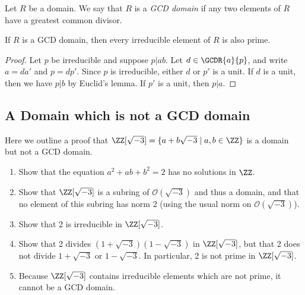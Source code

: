 \documentclass{article}
\begin{document}
\begin{dfn}
Let $R$ be a domain. We say that $R$ is a \emph{GCD domain} if any two elements of $R$ have a greatest common divisor.
\end{dfn}

\begin{prop}
If $R$ is a GCD domain, then every irreducible element of $R$ is also prime.
\end{prop}

\begin{proof}
Let $p$ be irreducible and suppose $p|ab$. Let $d \in \GCDR{a}{p}$, and write $a = da'$ and $p = dp'$. Since $p$ is irreducible, either $d$ or $p'$ is a unit. If $d$ is a unit, then we have $p|b$ by Euclid's lemma. If $p'$ is a unit, then $p|a$.
\end{proof}

\subsection*{A Domain which is not a GCD domain}

Here we outline a proof that $\ZZ[\sqrt{-3}] = \{ a+b\sqrt{-3} \mid a,b \in \ZZ \}$ is a domain but not a GCD domain.

\begin{enumerate}
\item Show that the equation $a^2 + ab + b^2 = 2$ has no solutions in $\ZZ$.
\item Show that $\ZZ[\sqrt{-3}]$ is a subring of $\mathcal{O}(\sqrt{-3})$ and thus a domain, and that no element of this subring has norm 2 (using the usual norm on $\mathcal{O}(\sqrt{-3})$).
\item Show that 2 is irreducible in $\ZZ[\sqrt{-3}]$.
\item Show that 2 divides $(1 + \sqrt{-3})(1 - \sqrt{-3})$ in $\ZZ[\sqrt{-3}]$, but that 2 does not divide $1 + \sqrt{-3}$ or $1 - \sqrt{-3}$. In particular, 2 is not prime in $\ZZ[\sqrt{-3}]$.
\item Because $\ZZ[\sqrt{-3}]$ contains irreducible elements which are not prime, it cannot be a GCD domain.
\end{enumerate}
\end{document}
